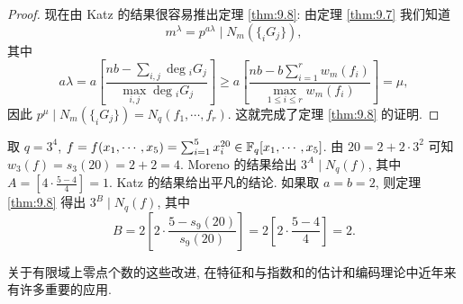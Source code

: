 \begin{proof}
现在由 Katz 的结果很容易推出定理 \ref{thm:9.8}: 由定理 \ref{thm:9.7} 我们知道
\[
  m^{\lambda}=p^{a\lambda}\mid N_m(\{_iG_j\}),
\]
其中
\[
  a\lambda=a\left[\frac{nb-\sum_{i,j}\deg{}_iG_j}
  {\max\limits_{i,j}\deg{}_iG_j}\right]
  \geqslant a\left[\frac{nb-b\sum_{i=1}^{r}w_m(f_i)}
  {\max\limits_{1\leqslant i\leqslant r}w_m(f_i)}\right]=\mu,
\]
因此 $p^{\mu}\mid N_m(\{_iG_j\})=N_q(f_1,\cdots,f_r)$. 这就完成了定理 \ref{thm:9.8} 的证明.
\end{proof}

\begin{example}
取 $q=3^4$, $f=f(x_1,\cdots,x_5)=\sum_{i=1}^{5}x_i^{20}\in\mathbb{F}_q[x_1,\cdots,x_5]$. 由 $20=2+2\cdot 3^2$ 可知 $w_3(f)=s_3(20)=2+2=4$. Moreno 的结果给出 $3^A\mid N_q(f)$, 其中 $A=\left[4\cdot\frac{5-4}{4}\right]=1$. Katz 的结果给出平凡的结论. 如果取 $a=b=2$, 则定理 \ref{thm:9.8} 得出 $3^B\mid N_q(f)$, 其中
\[
  B=2\left[2\cdot\frac{5-s_9(20)}{s_9(20)}\right]
  =2\left[2\cdot\frac{5-4}{4}\right]=2.
\]
\end{example}

关于有限域上零点个数的这些改进, 在特征和与指数和的估计和编码理论中近年来有许多重要的应用.

